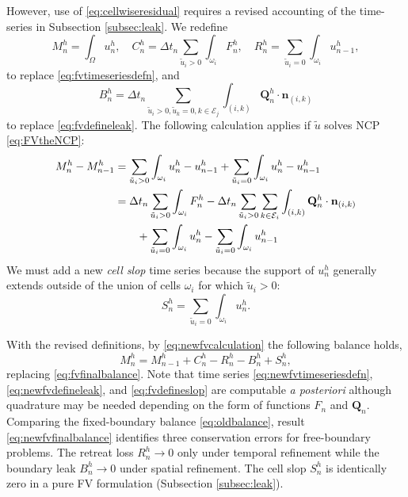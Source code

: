 \documentclass[final,onefignum]{siamart190516}
\newcommand\bn{\mathbf{n}}
\newcommand\bQ{\mathbf{Q}}
\begin{document}
However, use of \eqref{eq:cellwiseresidual} requires a revised accounting of the time-series in Subsection \ref{subsec:leak}.  We redefine
\begin{equation}
M_n^h = \int_\Omega u_n^h, \quad C_n^h = \Delta t_n \sum_{\tilde u_i>0} \int_{\omega_i} F_n^h, \quad R_n^h = \sum_{\tilde u_i=0} \int_{\omega_i} u_{n-1}^h, \label{eq:newfvtimeseriesdefn}
\end{equation}
to replace \eqref{eq:fvtimeseriesdefn}, and
\begin{equation}
B_n^h = \Delta t_n \sum_{\tilde u_i > 0, \tilde u_k = 0, k\in\mathcal{E}_j} \int_{(i,k)} \bQ_n^h \cdot \bn_{(i,k)} \label{eq:newfvdefineleak}
\end{equation}
to replace \eqref{eq:fvdefineleak}.  The following calculation applies if $\tilde u$ solves NCP \eqref{eq:FVtheNCP}:
\begin{align}
M_n^h - M_{n-1}^h &= \sum_{\tilde u_i>0} \int_{\omega_i} u_n^h - u_{n-1}^h + \sum_{\tilde u_i=0} \int_{\omega_i} u_n^h - u_{n-1}^h \label{eq:newfvcalculation} \\
  &= \Delta t_n \sum_{\tilde u_i>0} \int_{\omega_i} F_n^h - \Delta t_n \sum_{\tilde u_i>0} \sum_{k\in \mathcal{E}_i} \int_{(i,k)} \bQ_n^h \cdot \bn_{(i,k)} \notag \\
  &\qquad + \sum_{\tilde u_i=0} \int_{\omega_i} u_n^h - \sum_{\tilde u_i=0} \int_{\omega_i} u_{n-1}^h \notag
\end{align}
We must add a new \emph{cell slop} time series because the support of $u_n^h$ generally extends outside of the union of cells $\omega_i$ for which $\tilde u_i>0$:
\begin{equation}
S_n^h = \sum_{\tilde u_i=0} \int_{\omega_i} u_n^h. \label{eq:fvdefineslop}
\end{equation}

With the revised definitions, by \eqref{eq:newfvcalculation} the following balance holds,
\begin{equation}
  M_n^h = M_{n-1}^h + C_n^h - R_n^h - B_n^h + S_n^h, \label{eq:newfvfinalbalance}
\end{equation}
replacing \eqref{eq:fvfinalbalance}.  Note that time series \eqref{eq:newfvtimeseriesdefn}, \eqref{eq:newfvdefineleak}, and \eqref{eq:fvdefineslop} are computable \emph{a posteriori} although quadrature may be needed depending on the form of functions $F_n$ and $\bQ_n$.  Comparing the fixed-boundary balance \eqref{eq:oldbalance}, result \eqref{eq:newfvfinalbalance} identifies three conservation errors for free-boundary problems.  The retreat loss $R_n^h\to 0$ only under temporal refinement while the boundary leak $B_n^h\to 0$ under spatial refinement.  The cell slop $S_n^h$ is identically zero in a pure FV formulation (Subsection \ref{subsec:leak}).
\end{document}
